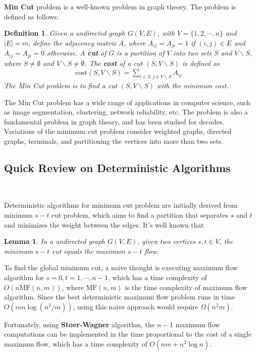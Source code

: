 \documentclass[11pt]{article}
\theoremstyle{plain}
\newtheorem{lemma}{Lemma}[section]
\newtheorem{definition}{Definition}[section]
\begin{document}
\textbf{Min Cut} problem is a well-known problem in graph theory. The problem is defined as follows: 
\begin{definition}
    Given a  undirected graph $G(V,E)$, with $V=\{1,2,\cdots,n\}$ and $|E|=m$, define the adjacency matrix $A$, where $A_{ij}=A_{ji}=1$ if $(i,j)\in E$ and $A_{ij}=A_{ji}=0$ otherwise. A \textbf{cut} of $G$ is a partition of $V$ into two sets $S$ and $V\backslash S$, where $S\neq\emptyset$ and $V\backslash S\neq\emptyset$. The \textbf{cost} of a cut $(S,V\backslash S)$ is defined as
    \begin{align*}
        \text{cost}(S,V\backslash S)=\sum_{i\in S, j\in V\backslash S}A_{ij}
    \end{align*}
    The Min Cut problem is to find a cut $(S,V\backslash S)$ with the minimum cost.
\end{definition}

The Min Cut problem has a wide range of applications in computer science, such as image segmentation, clustering, network reliability, etc. The problem is also a fundamental problem in graph theory, and has been studied for decades. Variations of the minimum cut problem consider weighted graphs, directed graphs, terminals, and partitioning the vertices into more than two sets.

\subsection{Quick Review on Deterministic Algorithms}\

Deterministic algorithms for minimum cut problem are initially derived from minimum $s-t$ cut problem, which aims to find a partition that separates $s$ and $t$ and minimizes the weight between the edges. It's well known that 
\begin{lemma}
    In a undirected graph $G(V,E)$, given two vertices $s,t\in V$, the minimum $s-t$ cut equals the maximum $s-t$ flow.
\end{lemma}
To find the global minimum cut, a naive thought is executing maximum flow algorithm for $s=0,t=1,\cdots,n-1$, which has a time complexity of $O(n\text{MF}(n,m))$, where $\text{MF}(n,m)$ is the time complexity of maximum flow algorithm. Since the best deterministic maximum flow problem runs in time $O(mn\log(n^2/m))$, using this naive approach would require $\Omega(n^2m)$. 

Fortunately, using \textbf{Stoer-Wagner}\cite{stoer1997simple} algorithm, the $n-1$ maximum flow computations can be implemented in the time proportional to the cost of a single maximum flow, which has a time complexity of $O(nm+n^2\log n)$. 
\end{document}
